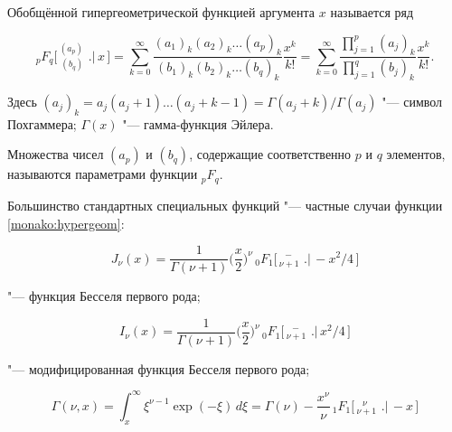 \smallskip



 Обобщённой гипергеометрической функцией аргумента $ x $ называется ряд

\begin{equation}

\label{monako:hypergeom}

_{p}F_{q}\bigg[\,^{\displaystyle (a_p)}_{\,\displaystyle (b_q)}\,\,\bigg.\bigg|\,x\,\bigg]=\sum_{k=0}^\infty\frac{(a_1)_k(a_2)_k\dots(a_p)_k}{(b_1)_k(b_2)_k\dots(b_q)_k}\frac{x^k}{k!}=\sum_{k=0}^\infty \frac{\prod\limits_{\scriptscriptstyle j=1}^{\scriptscriptstyle p} (a_j)_k}{\prod\limits_{\scriptscriptstyle j=1}^{\scriptscriptstyle q} (b_j)_k}\frac{x^k}{k!}.

\end{equation}

Здесь $(a_j)_k =a_j(a_j+1) \dots (a_j+k-1)= \Gamma (a_j+k) / \Gamma (a_j)$ "--- символ Похгаммера; $\Gamma (x)$ "--- гамма-функция Эйлера. 

Множества чисел $(a_p)$ и $(b_q)$, содержащие соответственно $ p $ и $ q $ элементов, называются параметрами функции $_{p}F_{q}$.



Большинство стандартных специальных функций "--- частные случаи функции \eqref{monako:hypergeom}: 

\begin{equation}

\label{monako:BesselJ}

J_\nu (x)=\frac{1}{\Gamma(\nu+1)}\Big(\frac{x}{2}\Big)^\nu\, _{0}F_{1}\bigg[\,^{\displaystyle \,\,\,\,-}_{\displaystyle \nu+1}\,\,\bigg.\bigg|\,-{x^2}/{4}\,\bigg]

\end{equation} 

"--- функция Бесселя первого рода;

\begin{equation}

\label{monako:BesselI}

I_\nu (x)=\frac{1}{\Gamma(\nu+1)}\Big(\frac{x}{2}\Big)^\nu\, _{0}F_{1}\bigg[\,^{\displaystyle \,\,\,\,-}_{\displaystyle \nu+1}\,\,\bigg.\bigg|\,{x^2}/{4}\,\bigg]

\end{equation}

"--- модифицированная функция Бесселя первого рода;

\begin{equation}

\label{monako:GGamma}

\Gamma(\nu,x)=\int _x^\infty\xi^{\nu-1}\exp(-\xi)\,d\xi = \Gamma(\nu)-\frac{x^\nu}{\nu}\, _{1}F_{1}\Big[\,^{\displaystyle \,\,\,\,\nu}_{\displaystyle \nu+1}\,\,\Big.\Big|\,-x\,\Big]

\end{equation}

